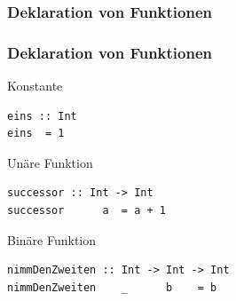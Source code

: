 \documentclass[fleqn,11pt,aspectratio=43]{beamer}
\begin{document}
\begin{frame}
\frametitle{Deklaration von Funktionen}
\end{frame}

\begin{frame}[fragile]
\frametitle{Deklaration von Funktionen} 
\vspace*{-2.5ex}
\begin{exampleblock}{Konstante}
\begin{lstlisting}
eins :: Int
eins  = 1
\end{lstlisting}
\end{exampleblock}
\vspace*{-2ex}
\pause
\begin{exampleblock}{Unäre Funktion}
\begin{lstlisting}
successor :: Int -> Int
successor      a  = a + 1
\end{lstlisting}
\end{exampleblock}
\vspace*{-2ex}
\pause
\begin{exampleblock}{Binäre Funktion}
\begin{lstlisting}
nimmDenZweiten :: Int -> Int -> Int
nimmDenZweiten    _      b    = b
\end{lstlisting}
\end{exampleblock}
\end{frame}
\end{document}
